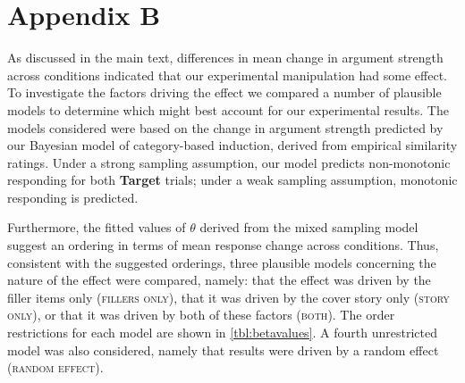 \documentclass[doc,12pt]{apa}
\newcommand{\cbi}{category-based induction}
\begin{document}

\section{Appendix B}

As discussed in the main text, differences in mean change in argument strength across conditions indicated that our experimental manipulation had some effect.
To investigate the factors driving the effect we compared a number of plausible models to determine which might best account for our experimental results. The models considered were based on the change in argument strength predicted by our Bayesian model of \cbi, derived from empirical similarity ratings. Under a strong sampling assumption, our model predicts non-monotonic responding for both {\bf Target} trials; under a weak sampling assumption, monotonic responding is predicted.

Furthermore, the fitted values of $\theta$ derived from the mixed sampling model suggest an ordering in terms of mean  response change across conditions. Thus, consistent with the suggested orderings, three plausible models concerning the nature of the effect were compared, namely: that the effect was driven by the filler items only (\textsc{fillers only}), that it was driven by the cover story only (\textsc{story only}), or that it was driven by both of these factors (\textsc{both}). The order restrictions for each model are shown in \cref{tbl:betavalues}. A fourth unrestricted model was also considered, namely that results were driven by a random effect (\textsc{random effect}).
\end{document}
